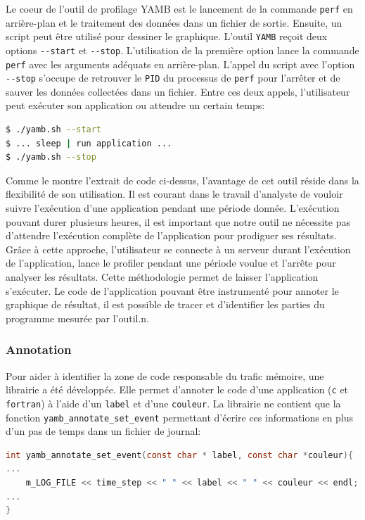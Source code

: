         Le coeur de l'outil de profilage YAMB est le lancement de la commande \verb=perf= en arrière-plan et le traitement des données dans un fichier de sortie. Ensuite, un script peut être utilisé pour dessiner le graphique. 
        L'outil \verb=YAMB= reçoit deux options \verb=--start= et \verb=--stop=. L'utilisation de la première option lance la commande \verb|perf| avec les arguments adéquats en arrière-plan. L'appel du script avec l'option \verb=--stop= s'occupe de retrouver le \verb|PID| du processus de \verb|perf| pour l'arrêter et de sauver les données collectées dans un fichier. Entre ces deux appels, l'utilisateur peut exécuter son application ou attendre un certain temps:
\begin{lstlisting}[language=bash]
$ ./yamb.sh --start
$ ... sleep | run application ...
$ ./yamb.sh --stop
\end{lstlisting}
        Comme le montre l'extrait de code ci-dessus, l'avantage de cet outil réside dans la flexibilité de son utilisation. Il est courant dans le travail d'analyste de vouloir suivre l'exécution d'une application pendant une période donnée. L'exécution pouvant durer plusieurs heures, il est important que notre outil ne nécessite pas d'attendre l'exécution complète de l'application pour prodiguer ses résultats. Grâce à cette approche, l'utilisateur se connecte à un serveur durant l'exécution de l'application, lance le profiler pendant une période voulue et l'arrête pour analyser les résultats. Cette méthodologie permet de laisser l'application s'exécuter. Le code de l'application pouvant être instrumenté pour annoter le graphique de résultat, il est possible de tracer et d'identifier les parties du programme mesurée par l'outil.n.
        

    \subsubsection{Annotation}

        Pour aider à identifier la zone de code responsable du trafic mémoire, une librairie a été développée. Elle permet d'annoter le code d'une application (\verb=c= et \verb=fortran=) à l'aide d'un \verb=label= et d'une \verb=couleur=. La librairie ne contient que la fonction \verb=yamb_annotate_set_event= permettant d'écrire ces informations en plus d'un pas de temps dans un fichier de journal:
\begin{lstlisting}[label=lst:yamb_api ,language=C]
int yamb_annotate_set_event(const char * label, const char *couleur){
...
    m_LOG_FILE << time_step << " " << label << " " << couleur << endl;
...
}
\end{lstlisting}
    


